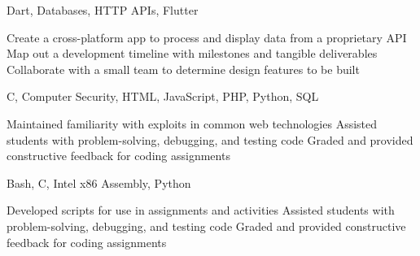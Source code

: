 \documentclass[12pt,letterpaper]{article}
\begin{document}
\begin{experiencesection}
    {Dart, Databases, HTTP APIs, Flutter}{
        \begin{details}
            \detail Create a cross-platform app to process and display data from a proprietary API
            \detail Map out a development timeline with milestones and tangible deliverables
            \detail Collaborate with a small team to determine design features to be built
        \end{details}
    }
    {C, Computer Security, HTML, JavaScript, PHP, Python, SQL}{
        \begin{details}
            \detail Maintained familiarity with exploits in common web technologies
            \detail Assisted students with problem-solving, debugging, and testing code
            \detail Graded and provided constructive feedback for coding assignments
        \end{details}
    }
    {Bash, C, Intel x86 Assembly, Python}{
        \begin{details}
            \detail Developed scripts for use in assignments and activities
            \detail Assisted students with problem-solving, debugging, and testing code
            \detail Graded and provided constructive feedback for coding assignments
        \end{details}
    }
\end{experiencesection}
\end{document}
